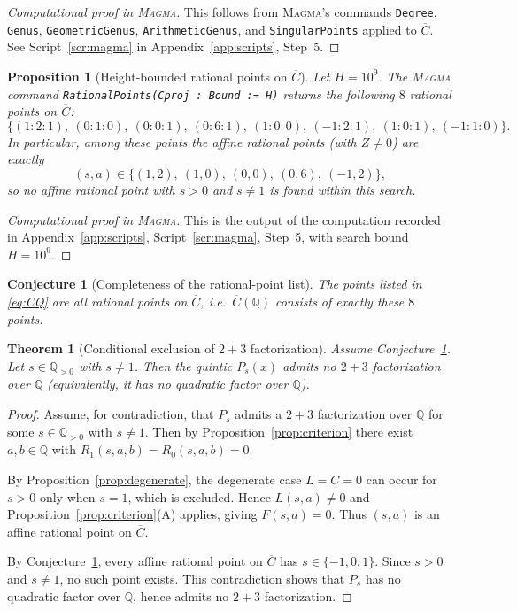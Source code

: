 \documentclass[12pt]{article}
\newtheorem{theorem}{Theorem}
\newtheorem{proposition}{Proposition}
\newtheorem{conjecture}{Conjecture}
\theoremstyle{remark}
\theoremstyle{definition}
\begin{document}
\begin{proof}[Computational proof in \textsc{Magma}]
This follows from \textsc{Magma}'s commands \texttt{Degree}, \texttt{Genus}, \texttt{GeometricGenus}, \texttt{ArithmeticGenus}, and \texttt{SingularPoints} applied to $\overline{C}$.
See Script~\ref{scr:magma} in Appendix~\ref{app:scripts}, Step~5.
\end{proof}

\begin{proposition}[Height-bounded rational points on $\overline{C}$]\label{prop:CPQ}
Let $H=10^{9}$.
The \textsc{Magma} command \texttt{RationalPoints(Cproj : Bound := H)} returns the following $8$ rational points on $\overline{C}$:
\begin{equation}\label{eq:CQ}
\{(1:2:1),\ (0:1:0),\ (0:0:1),\ (0:6:1),\ (1:0:0),\ (-1:2:1),\ (1:0:1),\ (-1:1:0)\}.
\end{equation}
In particular, among these points the affine rational points (with $Z\neq 0$) are exactly
\[
(s,a)\in\{(1,2),\ (1,0),\ (0,0),\ (0,6),\ (-1,2)\},
\]
so no affine rational point with $s>0$ and $s\neq 1$ is found within this search.
\end{proposition}

\begin{proof}[Computational proof in \textsc{Magma}]
This is the output of the computation recorded in Appendix~\ref{app:scripts}, Script~\ref{scr:magma}, Step~5, with search bound $H=10^{9}$.
\end{proof}

\begin{conjecture}[Completeness of the rational-point list]\label{conj:complete}
The points listed in \eqref{eq:CQ} are all rational points on $\overline{C}$, i.e.\ $\overline{C}(\mathbb{Q})$ consists of exactly these $8$ points.
\end{conjecture}

\begin{theorem}[Conditional exclusion of $2+3$ factorization]\label{thm:main}
Assume Conjecture~\ref{conj:complete}.
Let $s\in\mathbb{Q}_{>0}$ with $s\neq 1$.
Then the quintic $P_s(x)$ admits no $2+3$ factorization over $\mathbb{Q}$ (equivalently, it has no quadratic factor over $\mathbb{Q}$).
\end{theorem}

\begin{proof}
Assume, for contradiction, that $P_s$ admits a $2+3$ factorization over $\mathbb{Q}$ for some $s\in\mathbb{Q}_{>0}$ with $s\neq 1$.
Then by Proposition~\ref{prop:criterion} there exist $a,b\in\mathbb{Q}$ with $R_1(s,a,b)=R_0(s,a,b)=0$.

By Proposition~\ref{prop:degenerate}, the degenerate case $L=C=0$ can occur for $s>0$ only when $s=1$, which is excluded.
Hence $L(s,a)\neq 0$ and Proposition~\ref{prop:criterion}(A) applies, giving $F(s,a)=0$.
Thus $(s,a)$ is an affine rational point on $\overline{C}$.

By Conjecture~\ref{conj:complete}, every affine rational point on $\overline{C}$ has $s\in\{-1,0,1\}$.
Since $s>0$ and $s\neq 1$, no such point exists.
This contradiction shows that $P_s$ has no quadratic factor over $\mathbb{Q}$, hence admits no $2+3$ factorization.
\end{proof}
\end{document}
